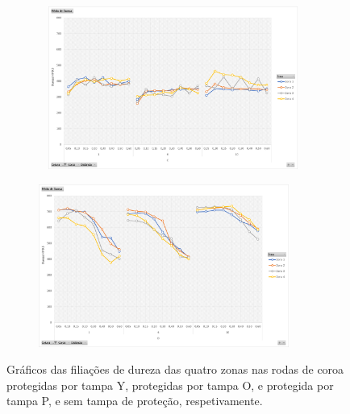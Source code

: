 \begin{figure}[htb]
\begin{subfigure}{.4\textwidth}
        \caption{}
        \label{fig:resultados_Tampa_O}
    \end{subfigure}
    \begin{subfigure}{.4\textwidth}\
        \centering
        \includegraphics[width = 0.9\textwidth]{Figures/Cap4/Grafico_4_Zonas_P.png}
        \caption{}
        \label{fig:resultados_Tampa_P}
    \end{subfigure}%
    \begin{subfigure}{.4\textwidth}
        \centering
        \includegraphics[width = 0.9\textwidth]{Figures/Cap4/Grafico_4_Zonas_ST.png}
        \caption{}
        \label{fig:resultados_ST}
    \end{subfigure}
    \caption[Filiações de dureza das quatro zonas na roda de coroa DB45 Nº 1]%
    {Gráficos das filiações de dureza das quatro zonas nas rodas de coroa protegidas por tampa Y, protegidas por tampa O, e protegida por tampa P, e sem tampa de proteção, respetivamente.}
\end{figure}
